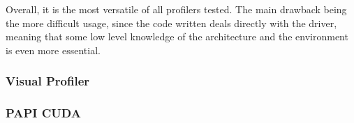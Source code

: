 Overall, it is the most versatile of all profilers tested. The main drawback being the more difficult usage, since the code written deals directly with the driver, meaning that some low level knowledge of the architecture and the environment is even more essential.

\subsubsection{Visual Profiler}
\label{sec:533}


\subsubsection{PAPI CUDA}
\label{sec:534}


